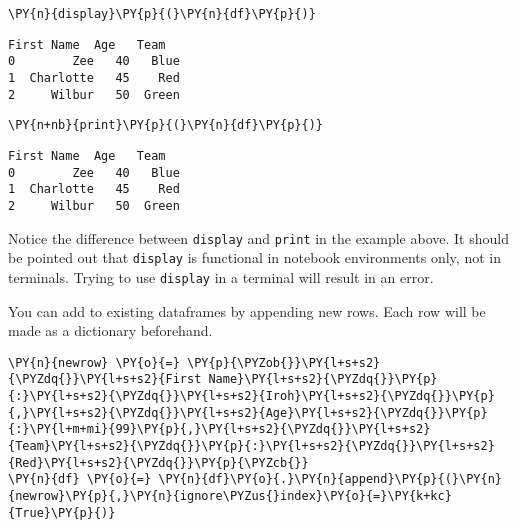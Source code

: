     \begin{tcolorbox}[breakable, size=fbox, boxrule=1pt, pad at break*=1mm,colback=cellbackground, colframe=cellborder]
\begin{Verbatim}[commandchars=\\\{\}]
\PY{n}{display}\PY{p}{(}\PY{n}{df}\PY{p}{)}
\end{Verbatim}
\end{tcolorbox}

    
    \begin{Verbatim}[commandchars=\\\{\}]
  First Name  Age   Team
0        Zee   40   Blue
1  Charlotte   45    Red
2     Wilbur   50  Green
    \end{Verbatim}

    
    \begin{tcolorbox}[breakable, size=fbox, boxrule=1pt, pad at break*=1mm,colback=cellbackground, colframe=cellborder]
\begin{Verbatim}[commandchars=\\\{\}]
\PY{n+nb}{print}\PY{p}{(}\PY{n}{df}\PY{p}{)}
\end{Verbatim}
\end{tcolorbox}

    \begin{Verbatim}[commandchars=\\\{\}]
  First Name  Age   Team
0        Zee   40   Blue
1  Charlotte   45    Red
2     Wilbur   50  Green
    \end{Verbatim}

    Notice the difference between \texttt{display} and \texttt{print} in the
example above. It should be pointed out that \texttt{display} is
functional in notebook environments only, not in terminals. Trying to
use \texttt{display} in a terminal will result in an error.

You can add to existing dataframes by appending new rows. Each row will
be made as a dictionary beforehand.

    \begin{tcolorbox}[breakable, size=fbox, boxrule=1pt, pad at break*=1mm,colback=cellbackground, colframe=cellborder]
\begin{Verbatim}[commandchars=\\\{\}]
\PY{n}{newrow} \PY{o}{=} \PY{p}{\PYZob{}}\PY{l+s+s2}{\PYZdq{}}\PY{l+s+s2}{First Name}\PY{l+s+s2}{\PYZdq{}}\PY{p}{:}\PY{l+s+s2}{\PYZdq{}}\PY{l+s+s2}{Iroh}\PY{l+s+s2}{\PYZdq{}}\PY{p}{,}\PY{l+s+s2}{\PYZdq{}}\PY{l+s+s2}{Age}\PY{l+s+s2}{\PYZdq{}}\PY{p}{:}\PY{l+m+mi}{99}\PY{p}{,}\PY{l+s+s2}{\PYZdq{}}\PY{l+s+s2}{Team}\PY{l+s+s2}{\PYZdq{}}\PY{p}{:}\PY{l+s+s2}{\PYZdq{}}\PY{l+s+s2}{Red}\PY{l+s+s2}{\PYZdq{}}\PY{p}{\PYZcb{}}
\PY{n}{df} \PY{o}{=} \PY{n}{df}\PY{o}{.}\PY{n}{append}\PY{p}{(}\PY{n}{newrow}\PY{p}{,}\PY{n}{ignore\PYZus{}index}\PY{o}{=}\PY{k+kc}{True}\PY{p}{)}
\end{Verbatim}
\end{tcolorbox}

